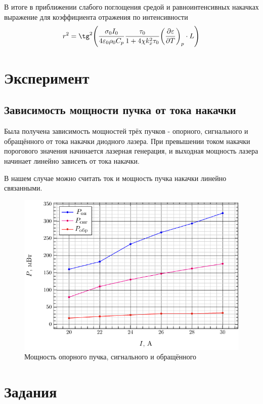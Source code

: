 \documentclass[a5paper,11pt]{extarticle}
\begin{document}
В итоге в приближении слабого поглощения средой и равноинтенсивных накачках выражение для коэффициента отражения по интенсивности 
\begin{equation}
	r^2 = \tg^2\qty(\frac{\sigma_0 I_0}{4\varepsilon_0 \rho_0 C_p}\frac{\tau_0}{1+4\chi k_x^2 \tau_0} \qty(\pdv{\varepsilon}{T})_p \cdot L)
\end{equation}




\section{Эксперимент}
\subsection{Зависимость мощности пучка от тока накачки}
Была получена зависимость мощностей трёх пучков - опорного, сигнального и обращённого от тока накачки диодного лазера. При превышении током накачки порогового значения начинается лазерная генерация, и выходная мощность лазера начинает линейно зависеть от тока накачки. 

В нашем случае можно считать ток и мощность пучка накачки линейно связанными.
\begin{figure}[H]
	\centering
	\includegraphics[]{fig/fig}
	\caption{Мощность опорного пучка, сигнального и обращённого}
	\label{fig:1}
\end{figure}



\section{Задания}
\end{document}
